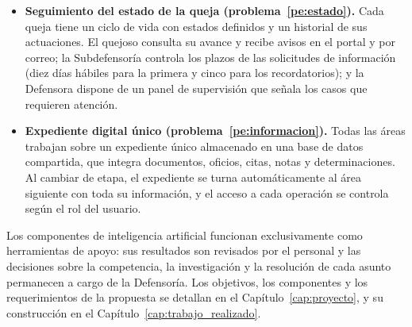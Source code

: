 \begin{itemize}
		\item \textbf{Seguimiento del estado de la queja (problema~\ref{pe:estado}).} Cada queja tiene un ciclo de vida con estados definidos y un historial de sus actuaciones. El quejoso consulta su avance y recibe avisos en el portal y por correo; la Subdefensoría controla los plazos de las solicitudes de información (diez días hábiles para la primera y cinco para los recordatorios); y la Defensora dispone de un panel de supervisión que señala los casos que requieren atención.

		\item \textbf{Expediente digital único (problema~\ref{pe:informacion}).} Todas las áreas trabajan sobre un expediente único almacenado en una base de datos compartida, que integra documentos, oficios, citas, notas y determinaciones. Al cambiar de etapa, el expediente se turna automáticamente al área siguiente con toda su información, y el acceso a cada operación se controla según el rol del usuario.
	\end{itemize}

	Los componentes de inteligencia artificial funcionan exclusivamente como herramientas de apoyo: sus resultados son revisados por el personal y las decisiones sobre la competencia, la investigación y la resolución de cada asunto permanecen a cargo de la Defensoría. Los objetivos, los componentes y los requerimientos de la propuesta se detallan en el Capítulo~\ref{cap:proyecto}, y su construcción en el Capítulo~\ref{cap:trabajo_realizado}.
